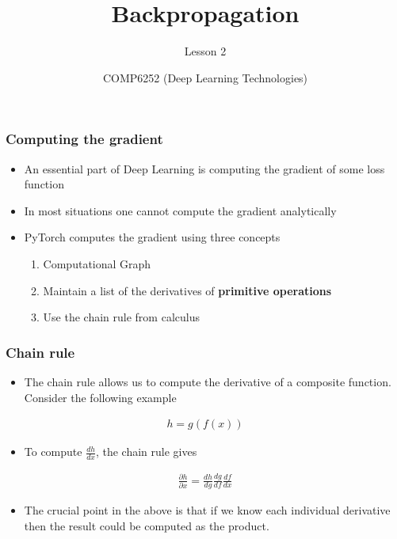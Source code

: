 \documentclass{beamer}
\title{Backpropagation}
\subtitle{Lesson 2}
\author{COMP6252 (Deep Learning Technologies)}
\institute[ECS, University of Southampton]{ECS, University of Southampton} \date{}
\theoremstyle{plain} %
\theoremstyle{example} %
\newcommand{\deriv}[2]{\ensuremath{\frac{\partial #1}{\partial #2}}}
\begin{document}
\begin{frame}
\placelogofalse %
\titlepage
\end{frame}

\placelogotrue %
\begin{frame}
    \frametitle{Computing the gradient}
\begin{itemize}
    \item An essential part of Deep Learning is computing the gradient of some loss function
    \item In most situations one cannot compute the gradient analytically
    \item PyTorch computes the gradient using three concepts
    \begin{enumerate}
        \item Computational Graph
        \item Maintain a list of the derivatives of \textbf{primitive operations}
        \item Use the chain rule from calculus
    \end{enumerate}
\end{itemize}
    

\end{frame}


\begin{frame}
    \frametitle{Chain rule}
\begin{itemize}
    \item The chain rule allows us to compute the derivative of a composite function. Consider the following example
\end{itemize}
\begin{align*}
    h=g(f(x))
\end{align*}
\begin{itemize}
    \item To  compute $\frac{dh}{dx}$, the chain rule gives
\end{itemize}    
\begin{align*}
    \deriv{h}{x}=\frac{dh}{dg}\frac{dg}{df}\frac{df}{dx}
\end{align*}
\begin{itemize}
    \item The crucial point in the above is that if we know each individual derivative then the result could be computed as the product.
\end{itemize}
\end{frame}
\end{document}
